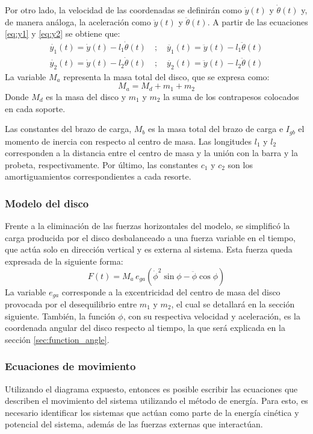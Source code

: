 Por otro lado, la velocidad de las coordenadas se definirán como $\dot{y}(t)$ y $\dot{\theta}(t)$ y, de manera análoga, la aceleración como $\ddot{y}(t)$ y $\ddot{\theta}(t)$. A partir de las ecuaciones \ref{eq:y1} y \ref{eq:y2} se obtiene que:
\begin{gather}
	\dot{y_1}(t) = \dot{y}(t) - l_1\dot{\theta}(t) \quad ;\quad \ddot{y_1}(t) = \ddot{y}(t) - l_1\ddot{\theta}(t) \\
 	\dot{y_2}(t) = \dot{y}(t) - l_2\dot{\theta}(t) \quad ;\quad \ddot{y_2}(t) = \ddot{y}(t) - l_2\ddot{\theta}(t) 
\end{gather}
La variable $M_a$ representa la masa total del disco, que se expresa como:
\begin{equation}\label{eq:m_a}
	M_a = M_d + m_1 + m_2
\end{equation}
Donde $M_d$ es la masa del disco y $m_1$ y $m_2$ la suma de los contrapesos colocados en cada soporte. 

Las constantes del brazo de carga, $M_b$ es la masa total del brazo de carga e $I_{gb}$ el momento de inercia con respecto al centro de masa. Las longitudes $l_1$ y $l_2$ corresponden a la distancia entre el centro de masa y la unión con la barra y la probeta, respectivamente. Por último, las constantes $c_1$ y $c_2$ son los amortiguamientos correspondientes a cada resorte.


\subsubsection{Modelo del disco}
Frente a la eliminación de las fuerzas horizontales del modelo, se simplificó la carga producida por el disco desbalanceado a una fuerza variable en el tiempo, que actúa solo en dirección vertical y es externa al sistema. Esta fuerza queda expresada de la siguiente forma:
\begin{equation}\label{eq:fza_gen}
	F(t) = M_a\, e_{ga}(\dot{\phi}^2 \sin\phi - \ddot{\phi} \cos\phi)
\end{equation}
La variable $e_{ga}$ corresponde a la excentricidad del centro de masa del disco provocada por el desequilibrio entre $m_1$ y $m_2$, el cual se detallará en la sección siguiente. También, la función $\phi$, con su respectiva velocidad y aceleración, es la coordenada angular del disco respecto al tiempo, la que será explicada en la sección \ref{sec:function_angle}.

\subsubsection{Ecuaciones de movimiento}
Utilizando el diagrama expuesto, entonces es posible escribir las ecuaciones que describen el movimiento del sistema utilizando el método de energía. Para esto, es necesario identificar los sistemas que actúan como parte de la energía cinética y potencial del sistema, además de las fuerzas externas que interactúan.

